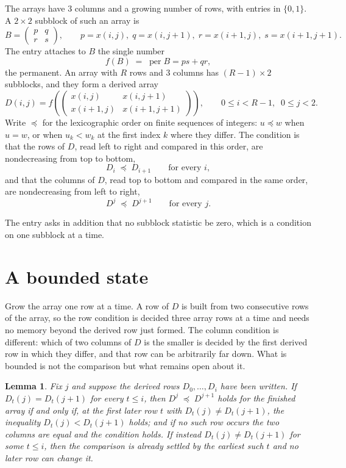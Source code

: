 \documentclass[11pt,a4paper]{article}
\theoremstyle{plain}
\newtheorem{lemma}[theorem]{Lemma}
\theoremstyle{definition}
\begin{document}
The arrays have $3$ columns and a growing number of rows, with entries in $\{0,1\}$. A
$2\times2$ subblock of such an array is
\[
B=\begin{pmatrix} p & q \\ r & s \end{pmatrix},
\qquad p=x(i,j),\; q=x(i,j+1),\; r=x(i+1,j),\; s=x(i+1,j+1).
\]
The entry attaches to $B$ the single number
\[
f(B)\;=\;\operatorname{per}B=ps+qr,
\]
the permanent. An array with $R$ rows and $3$ columns has $(R-1)\times2$ subblocks, and they
form a derived array
\[
D(i,j)=f\!\left(\begin{pmatrix} x(i,j) & x(i,j+1) \\ x(i+1,j) & x(i+1,j+1)\end{pmatrix}
\right),\qquad 0\le i<R-1,\;\; 0\le j<2 .
\]
Write $\preceq$ for the lexicographic order on finite sequences of integers: $u\preceq w$ when
$u=w$, or when $u_k<w_k$ at the first index $k$ where they differ. The condition is that the
rows of $D$, read left to right and compared in this order, are nondecreasing from top to bottom,
\[
D_{i}\;\preceq\;D_{i+1}\qquad\text{for every } i,
\]
and that the columns of $D$, read top to bottom and compared in the same order, are nondecreasing
from left to right,
\[
D^{j}\;\preceq\;D^{j+1}\qquad\text{for every } j .
\]

The entry asks in addition that no subblock statistic be zero, which is a condition on one subblock at a time.


\section{A bounded state}

Grow the array one row at a time. A row of $D$ is built from two consecutive rows of the array,
so the row condition is decided three array rows at a time and needs no memory beyond the
derived row just formed. The column condition is different: which of two columns of $D$ is the
smaller is decided by the first derived row in which they differ, and that row can be
arbitrarily far down. What is bounded is not the comparison but what remains open about it.

\begin{lemma}\label{lem:bits}
Fix $j$ and suppose the derived rows $D_0,\dots,D_i$ have been written. If $D_t(j)=D_t(j+1)$ for
every $t\le i$, then $D^{j}\;\preceq\;D^{j+1}$ holds for the finished array if and only if,
at the first later row $t$ with $D_t(j)\neq D_t(j+1)$, the inequality $D_t(j)<D_t(j+1)$
holds; and if no such row occurs the two columns are equal and the condition holds. If instead
$D_t(j)\neq D_t(j+1)$ for some $t\le i$, then the comparison is already settled by the earliest
such $t$ and no later row can change it.
\end{lemma}
\end{document}
